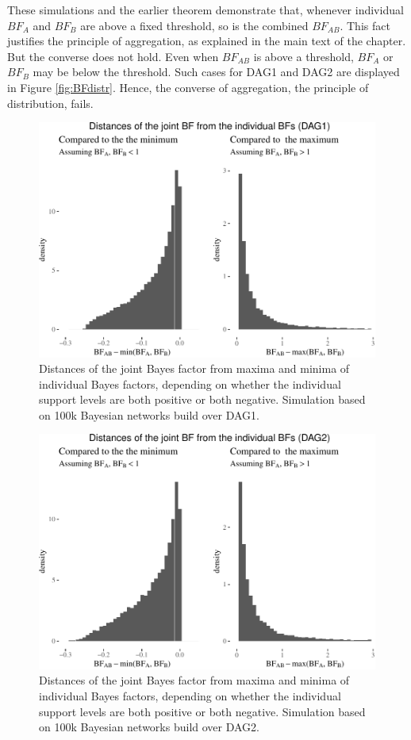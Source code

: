 \documentclass[
  10pt,
  dvipsnames,enabledeprecatedfontcommands]{scrartcl}
\begin{document}
These simulations and the earlier theorem demonstrate that, whenever
individual \(BF_A\) and \(BF_B\) are above a fixed threshold, so is the
combined \(BF_{AB}\). This fact justifies the principle of aggregation,
as explained in the main text of the chapter. But the converse does not
hold. Even when \(BF_{AB}\) is above a threshold, \(BF_A\) or \(BF_B\)
may be below the threshold. Such cases for \textsf{DAG1} and
\textsf{DAG2} are displayed in Figure \ref{fig:BFdistr}. Hence, the
converse of aggregation, the principle of distribution, fails.

\begin{figure}

\begin{center}\includegraphics[width=0.7\linewidth]{conjunction-appendix14_files/figure-latex/BFind-1} \end{center}

\caption{Distances of the joint Bayes factor from maxima and minima of individual Bayes factors, depending on whether the individual support levels are both positive or both negative. Simulation based on 100k Bayesian networks build over \textsf{DAG1}.}
\label{fig:DAG1BFF}
\end{figure}

\begin{figure}

\begin{center}\includegraphics[width=0.7\linewidth]{conjunction-appendix14_files/figure-latex/BFind2-1} \end{center}

\caption{Distances of the joint Bayes factor from maxima and minima of individual Bayes factors, depending on whether the individual support levels are both positive or both negative. Simulation based on 100k Bayesian networks build over \textsf{DAG2}.}
\label{fig:BFind2}
\end{figure}
\end{document}
